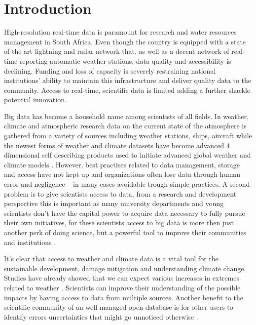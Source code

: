 \documentclass{wrcreport}
\begin{document}

\chapter{Introduction}


High-resolution real-time data is paramount for research and water
resources management in South Africa. Even though the country is
equipped with a state of the art lightning and radar network that, as
well as a decent network of real-time reporting automatic weather
stations, data quality and accessibility is declining. Funding and
loss of capacity is severely restraining national institutions'
ability to maintain this infrastructure and deliver quality data to
the community. Access to real-time, scientific data is limited adding
a further shackle potential innovation.

Big data has become a household name among scientists of all fields.
In weather, climate and atmospheric research data on the current state
of the atmosphere is gathered from a variety of sources including
weather stations, ships, aircraft while the newest forms of weather
and climate datasets have become advanced 4 dimensional self
describing products used to initiate advanced global weather and
climate models \citep{Kaltenbock2009, Huffman2016, Skamarock2008}.
However, best practises related to data management, storage and access
have not kept up and organizations often lose data through human error
and negligence -- in many cases avoidable trough simple practices. A
second problem is to give scientists access to data, from a research
and development perspective this is important as many university
departments and young scientists don't have the capital power to
acquire data necessary to fully pursue their own initiatives, for
these scientists access to big data is more then just another perk of
doing science, but a powerful tool to improve their communities and
institutions \citep{Kitchin2014, Turner2015, Perkmann2015}.

It's clear that access to weather and climate data is a vital tool for
the sustainable development, damage mitigation and understanding
climate change. Studies have already showed that we can expect various
increases in extremes related to weather \citep{piketh2014climate}.
Scientists can improve their understanding of the possible impacts by
having access to data from multiple sources. Another benefit to the
scientific community of an well managed open database is for other
users to identify errors uncertainties that might go unnoticed
otherwise \citep{Davies2016}. 
\end{document}
